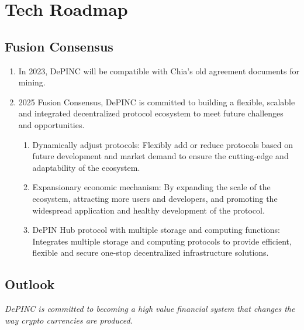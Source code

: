 \chapter{Tech Roadmap}
\section{Fusion Consensus}
\begin{enumerate}
    \item In 2023, DePINC will be compatible with Chia's old agreement documents for mining.
    \item 2025 Fusion Consensus, DePINC is committed to building a flexible, scalable and integrated decentralized protocol ecosystem to meet future challenges and opportunities.
    \begin{enumerate}
        \item Dynamically adjust protocols: Flexibly add or reduce protocols based on future development and market demand to ensure the cutting-edge and adaptability of the ecosystem.
        \item Expansionary economic mechanism: By expanding the scale of the ecosystem, attracting more users and developers, and promoting the widespread application and healthy development of the protocol.
        \item DePIN Hub protocol with multiple storage and computing functions: Integrates multiple storage and computing protocols to provide efficient, flexible and secure one-stop decentralized infrastructure solutions.
    \end{enumerate}
\end{enumerate}
\pagebreak
\section{Outlook}
\begin{flushleft}
    \textit{DePINC is committed to becoming a high value financial system that changes the way crypto currencies are produced.}
\end{flushleft}

